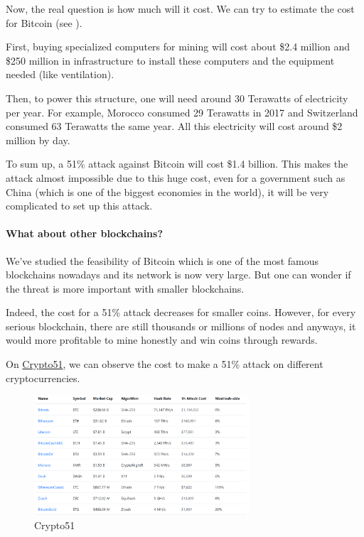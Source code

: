 Now, the real question is how much will it cost. We can try to estimate the cost for Bitcoin (see \cite{cost_bitcoin_51_attack}). \newline

First, buying specialized computers for mining will cost about \$2.4 million and \$250 million in infrastructure to install these computers and the equipment needed (like ventilation). \newline

Then, to power this structure, one will need around 30 Terawatts of electricity per year. For example, Morocco consumed 29 Terawatts in 2017 and Switzerland consumed 63 Terawatts the same year. All this electricity will cost around \$2 million by day. \newline

To sum up, a 51\% attack against Bitcoin will cost \$1.4 billion. This makes the attack almost impossible due to this huge cost, even for a government such as China (which is one of the biggest economies in the world), it will be very complicated to set up this attack.

    \paragraph{What about other blockchains?}


We've studied the feasibility of Bitcoin which is one of the most famous blockchains nowadays and its network is now very large. But one can wonder if the threat is more important with smaller blockchains. \newline

Indeed, the cost for a 51\% attack decreases for smaller coins. However, for every serious blockchain, there are still thousands or millions of nodes and anyways, it would more profitable to mine honestly and win coins through rewards.

On \href{https://www.crypto51.app/}{Crypto51}, we can observe the cost to make a 51\% attack on different cryptocurrencies. \newline

\begin{figure}[h]
\centering
\includegraphics[width=8cm]{Figures/crypto51}
\caption{Crypto51}
\end{figure}
\medskip


